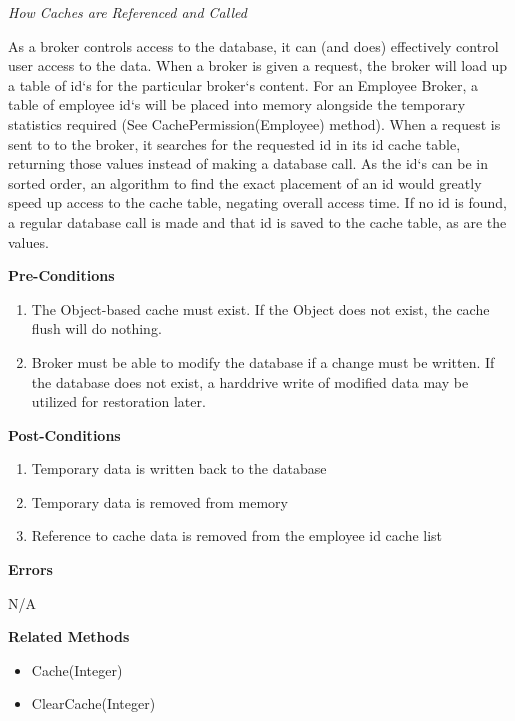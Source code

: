 \documentclass[letterpaper,12pt]{report}
\begin{document}
{\begin{description}
	\par \noindent
	\textit{How Caches are Referenced and Called}
	\par \noindent \hspace*{1cm} As a broker controls access to the database, it can (and does) effectively control user access to the data. When a broker is given a request, the broker will load up a table of id`s for the particular broker`s content. For an Employee Broker, a table of employee id`s will be placed into memory alongside the temporary statistics required (See CachePermission(Employee) method). When a request is sent to to the broker, it searches for the requested id in its id cache table, returning those values instead of making a database call. As the id`s can be in sorted order, an algorithm to find the exact placement of an id would greatly speed up access to the cache table, negating overall access time. If no id is found, a regular database call is made and that id is saved to the cache table, as are the values. 
     \item \textbf{Pre-Conditions}
	\begin{enumerate}
	   \item The Object-based cache must exist. If the Object does not exist, the cache flush will do nothing.
	   \item Broker must be able to modify the database if a change must be written. If the database does not exist, a harddrive write of modified data may be utilized for restoration later.
	  \end{enumerate}
     \item \textbf{Post-Conditions}
	\begin{enumerate}
	 \item Temporary data is written back to the database
	 \item Temporary data is removed from memory
	 \item Reference to cache data is removed from the employee id cache list
	\end{enumerate}
     \item[] \textbf{Errors}
	\par \noindent \hspace*{1cm} N/A
     \item \textbf{Related Methods} 
     \begin{itemize}
      \item Cache(Integer)
      \item ClearCache(Integer)
     \end{itemize}

    \end{description}
}
\end{document}
